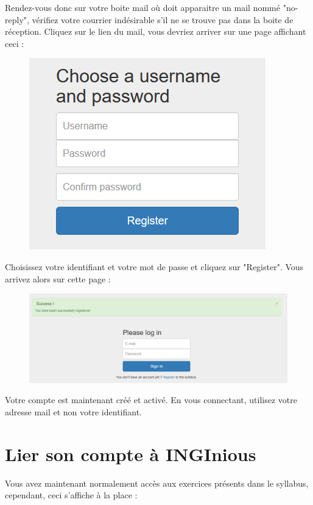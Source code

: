 \documentclass{article}
\begin{document}
Rendez-vous donc sur votre boite mail où doit apparaitre un mail nommé "no-reply", vérifiez votre courrier indésirable s'il ne se trouve pas dans la boite de réception. Cliquez sur le lien du mail, vous devriez arriver sur une page affichant ceci :

\begin{figure}[!htb]
    \centering
    \includegraphics[scale=0.5]{images/choose_mdp.png}
\end{figure}

\newpage
Choisissez votre identifiant et votre mot de passe et cliquez sur "Register". Vous arrivez alors sur cette page :

\begin{figure}[!htb]
    \centering
    \includegraphics[scale=0.5]{images/Success.png}
\end{figure}

Votre compte est maintenant créé et activé. En vous connectant, utilisez votre adresse mail et non votre identifiant.

\section{Lier son compte à INGInious}

Vous avez maintenant normalement accès aux exercices présents dans le syllabus, cependant, ceci s'affiche à la place :
\end{document}
